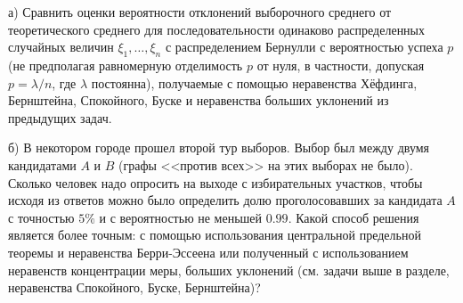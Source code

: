 \begin{problem} %
\label{KL_EF}
а) Сравнить оценки вероятности отклонений выборочного среднего от теоретического среднего для последовательности одинаково распределенных случайных величин $\xi_1,\dots,\xi_n$ с распределением Бернулли с вероятностью успеха $p$ (не предполагая равномерную отделимость $p$ от нуля, в частности, допуская $p = \lambda/n$, где $\lambda$ постоянна), получаемые с помощью неравенства Хёфдинга, Бернштейна, Спокойного, Буске и неравенства больших уклонений из предыдущих задач.

б) В некотором городе прошел второй тур выборов. Выбор был между двумя кандидатами $A$ и $B$ (графы <<против всех>> на этих выборах не было). 
Сколько человек надо опросить на выходе с избирательных участков, чтобы исходя из ответов можно было определить долю проголосовавших 
за кандидата $A$ с точностью $5\%$ и с вероятностью не меньшей $0.99$. %
%
Какой способ решения является более точным: с помощью использования центральной предельной теоремы и неравенства Берри-Эссеена или полученный с использованием неравенств концентрации меры, больших уклонений (см. задачи выше в разделе, неравенства Спокойного, Буске, Бернштейна)?
\end{problem}

